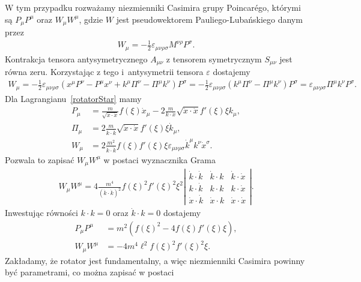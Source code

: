 W tym przypadku rozważamy niezmienniki Casimira grupy 
Poincarégo, którymi są
$P_\mu P^\mu$ oraz
$W_\mu W^\mu$, gdzie $W$ jest pseudowektorem Pauliego-Lubańskiego 
danym przez
\begin{align*}
W_\mu = - \frac{1}{2} \varepsilon_{\mu\nu\rho\sigma}
M^{\nu\rho} P^\sigma.
\end{align*}
Kontrakcja tensora antysymetrycznego $A_{\mu\nu}$ z 
tensorem symetrycznym $S_{\mu\nu}$ jest równa zeru. 
Korzystając z tego i~antysymetrii tensora $\varepsilon$ dostajemy
\begin{align*}
W_\mu = - \frac{1}{2} \varepsilon_{\mu\nu\rho\sigma}
(x^\mu P^\nu - P^\mu x^\nu + k^\mu \Pi^\nu - \Pi^\mu k^\nu) P^\sigma = 
 - \frac{1}{2} \varepsilon_{\mu\nu\rho\sigma}
( k^\mu \Pi^\nu - \Pi^\mu k^\nu) P^\sigma = 
  \varepsilon_{\mu\nu\rho\sigma}
 \Pi^\mu k^\nu P^\sigma .
\end{align*}
Dla Lagrangianu~\eqref{rotatorStar} mamy
\begin{align*}
P_\mu &=  \frac{m}{\sqrt{ \dot{x} \cdot \dot{x} }} f(\xi) \dot{x}_\mu 
- 2 \frac{m}{k \cdot \dot{x}} \sqrt{ \dot{x} \cdot \dot{x} }
f'(\xi) \xi k_\mu , \\
\Pi_\mu &= 2 \frac{m}{\dot{k} \cdot \dot{k}} \sqrt{ \dot{x} \cdot \dot{x} }
f'(\xi) \xi \dot{k}_\mu , \\
W_\mu &=  
2\frac{m^2}{ \dot{k} \cdot \dot{k}} 
f(\xi) f'(\xi) \xi \varepsilon_{\mu\nu\rho\sigma} 
 \dot{k}^\mu k^\nu \dot{x}^\sigma .
\end{align*}
Pozwala to zapisać $W_\mu W^\mu$ w postaci wyznacznika Grama
\begin{align*}
W_\mu W^\mu = 
4 \frac{m^4}{ (\dot{k} \cdot \dot{k})^2} 
f(\xi)^2 f'(\xi)^2 \xi^2 
\left| 
\begin{array}{ccc}
\dot{k} \cdot \dot{k}& \dot{k} \cdot k& \dot{k} \cdot \dot{x}\\
k \cdot \dot{k}& k \cdot k &k  \cdot \dot{x}\\
\dot{x} \cdot \dot{k}& \dot{x} \cdot k &\dot{x} \cdot \dot{x}
\end{array}
\right|.
\end{align*}
Inwestując równości $k\cdot k=0$ 
oraz $\dot{k} \cdot k= 0$ dostajemy
\begin{align*}
P_\mu P^\mu &=  m^2( f(\xi)^2- 4 f(\xi) f'(\xi) \xi), \\
W_\mu W^\mu &= 
 - 4 m^4\ell^2  f(\xi)^2 f'(\xi)^2 \xi .
\end{align*}
Zakładamy, że rotator jest fundamentalny, a więc niezmienniki
Casimira powinny być parametrami, co można zapisać w postaci
